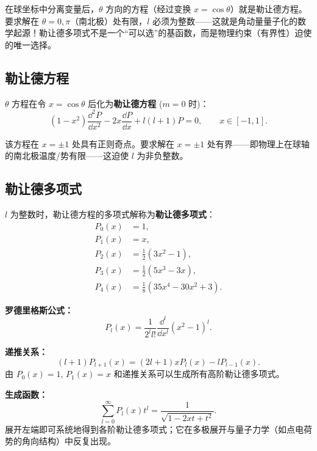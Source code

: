 在球坐标中分离变量后，$\theta$ 方向的方程（经过变换 $x=\cos\theta$）就是勒让德方程。要求解在 $\theta=0,\pi$（南北极）处有限，$l$ 必须为整数——这就是角动量量子化的数学起源！勒让德多项式不是一个“可以选”的基函数，而是物理约束（有界性）迫使的唯一选择。

\subsection{勒让德方程}

$\theta$ 方程在令 $x = \cos\theta$ 后化为\textbf{勒让德方程} ($m=0$ 时)：
\begin{equation}
(1-x^2)\frac{\dd^2 P}{\dd x^2} - 2x\frac{\dd P}{\dd x}
+ l(l+1)P = 0,\qquad x\in[-1,1].
\label{eq:legendre_ode}
\end{equation}

该方程在 $x=\pm1$ 处具有正则奇点。要求解在 $x=\pm1$ 处有界——即物理上在球轴的南北极温度/势有限——这迫使 $l$ 为非负整数。

\subsection{勒让德多项式}

$l$ 为整数时，勒让德方程的多项式解称为\textbf{勒让德多项式}：
\begin{align}
P_0(x) &= 1,\\
P_1(x) &= x,\\
P_2(x) &= \frac{1}{2}(3x^2-1),\\
P_3(x) &= \frac{1}{2}(5x^3-3x),\\
P_4(x) &= \frac{1}{8}(35x^4-30x^2+3).
\end{align}

\textbf{罗德里格斯公式：}
\begin{equation}
P_l(x) = \frac{1}{2^l l!}\frac{\dd^l}{\dd x^l}(x^2-1)^l.
\label{eq:rodrigues}
\end{equation}

\textbf{递推关系：}
\begin{equation}
(l+1)P_{l+1}(x) = (2l+1)xP_l(x) - lP_{l-1}(x).
\end{equation}
由 $P_0(x)=1$, $P_1(x)=x$ 和递推关系可以生成所有高阶勒让德多项式。

\textbf{生成函数：}
\begin{equation}
\sum_{l=0}^{\infty} P_l(x)t^l = \frac{1}{\sqrt{1-2xt+t^2}}.
\label{eq:legendre_genfunc}
\end{equation}
展开左端即可系统地得到各阶勒让德多项式；它在多极展开与量子力学（如点电荷势的角向结构）中反复出现。

